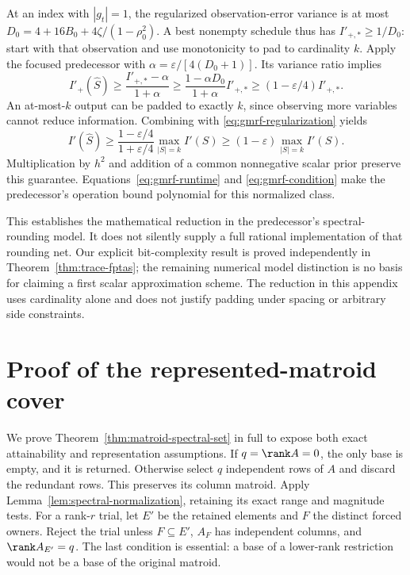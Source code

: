 At an index with $|g_t|=1$, the regularized observation-error variance is
at most $D_0=4+16B_0+4\zeta/(1-\rho_0^2)$. A best nonempty schedule thus
has $I'_{+,*}\ge1/D_0$: start with that observation and use monotonicity to
pad to cardinality $k$. Apply the focused predecessor with
$\alpha=\varepsilon/[4(D_0+1)]$. Its variance ratio implies
\[
 I'_+(\widehat S)\ge\frac{I'_{+,*}-\alpha}{1+\alpha}
 \ge\frac{1-\alpha D_0}{1+\alpha}I'_{+,*}
 \ge(1-\varepsilon/4)I'_{+,*}.
\]
An at-most-$k$ output can be padded to exactly $k$, since observing more
variables cannot reduce information. Combining with
\eqref{eq:gmrf-regularization} yields
\[
 I'(\widehat S)\ge
 \frac{1-\varepsilon/4}{1+\varepsilon/4}\max_{|S|=k}I'(S)
 \ge(1-\varepsilon)\max_{|S|=k}I'(S).
\]
Multiplication by $h^2$ and addition of a common nonnegative scalar prior
preserve this guarantee. Equations~\eqref{eq:gmrf-runtime} and
\eqref{eq:gmrf-condition} make the predecessor's operation bound polynomial
for this normalized class.

This establishes the mathematical reduction in the predecessor's
spectral-rounding model. It does not silently supply a full rational
implementation of that rounding net. Our explicit bit-complexity result is
proved independently in Theorem~\ref{thm:trace-fptas}; the remaining numerical
model distinction is no basis for claiming a first scalar approximation
scheme. The reduction in this appendix uses cardinality alone and does not
justify padding under spacing or arbitrary side constraints.

\section{Proof of the represented-matroid cover}
\label{app:matroid-proof}
We prove Theorem~\ref{thm:matroid-spectral-set} in full to expose both exact
attainability and representation assumptions. If $q=\rank A=0$, the only
base is empty, and it is returned. Otherwise select $q$ independent rows
of $A$ and discard the redundant rows. This preserves its column matroid.
Apply Lemma~\ref{lem:spectral-normalization}, retaining its exact
range and magnitude tests. For a rank-$r$ trial, let $E'$ be the retained
elements and $F$ the distinct forced owners. Reject the trial unless
$F\subseteq E'$, $A_F$ has independent columns, and $\rank A_{E'}=q$.
The last condition is essential: a base of a lower-rank restriction would
not be a base of the original matroid.

